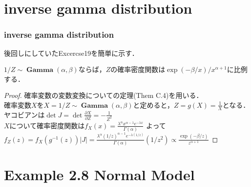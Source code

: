 \documentclass[dvipdfmx,cjk]{beamer}
\theoremstyle{example}
\DeclareMathOperator{\Gam}{\mathbf{Gamma}}
\newcommand{\abs}[1]{\lvert #1 \rvert}
\begin{document}
\section{inverse gamma distribution}
\begin{frame}
    \frametitle{inverse gamma distribution}
    後回しにしていたExcercse19を簡単に示す．
    \begin{theorem}
        $1/Z\sim \Gam(\alpha,\beta)$ならば，$Z$の確率密度関数は$\exp (-\beta/x)/x^{\alpha+1}$に比例する．
    \end{theorem}
    \begin{proof}
        確率変数の変数変換についての定理(Them C.4)を用いる．\\
        確率変数$X$を$X=1/Z\sim \Gam(\alpha,\beta)$と定めると，$Z=g(X)=\frac{1}{X}$となる．\\
        ヤコビアンは$\det J=\det\frac{\partial X}{\partial Z}=-\frac{1}{Z^2}$\\
        $X$について確率密度関数は$f_X(x)=\frac{\lambda^\alpha x^{\alpha-1} e^{-\lambda x}}{\Gamma(\alpha)}$
        よって$f_Z(z)=f_X(g^{-1}(z))\abs{J}=\frac{\lambda^\alpha (1/z)^{\alpha-1} e^{-\lambda (1/z)}}{\Gamma(\alpha)}(1/z^2)\propto\frac{\exp (-\beta/z)}{z^{\alpha+1}}$
    \end{proof}
\end{frame}

\section{Example 2.8 Normal Model}
\end{document}
